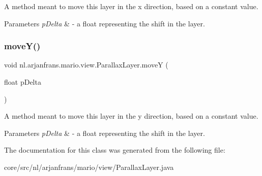 A method meant to move this layer in the x direction, based on a constant value. 


\begin{DoxyParams}{Parameters}
{\em p\+Delta} & -\/ a float representing the shift in the layer. \\
\hline
\end{DoxyParams}
\mbox{\label{classnl_1_1arjanfrans_1_1mario_1_1view_1_1ParallaxLayer_a961341849470a053f57c1a08000cdf69}} 
\subsubsection{\texorpdfstring{move\+Y()}{moveY()}}
{\footnotesize\ttfamily void nl.\+arjanfrans.\+mario.\+view.\+Parallax\+Layer.\+moveY (\begin{DoxyParamCaption}\item[{float}]{p\+Delta }\end{DoxyParamCaption})\hspace{0.3cm}{\ttfamily [protected]}}



A method meant to move this layer in the y direction, based on a constant value. 


\begin{DoxyParams}{Parameters}
{\em p\+Delta} & -\/ a float representing the shift in the layer. \\
\hline
\end{DoxyParams}


The documentation for this class was generated from the following file\+:\begin{DoxyCompactItemize}
\item 
core/src/nl/arjanfrans/mario/view/Parallax\+Layer.\+java\end{DoxyCompactItemize}
